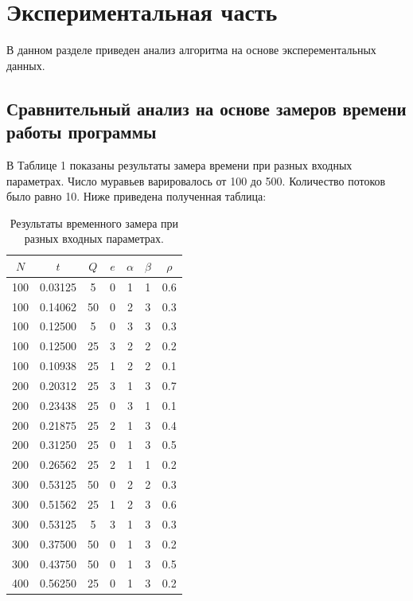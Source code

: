 \documentclass[12pt]{report}
\begin{document}
\chapter{Экспериментальная часть}

В данном разделе приведен анализ алгоритма на основе эксперементальных данных.

\section{Сравнительный анализ на основе замеров времени работы программы} 

В Таблице 1 показаны результаты замера времени при разных входных параметрах. Число муравьев варировалось от 100 до 500. Количество потоков было равно 10. Ниже приведена полученная таблица:

\begin{table}[h]
	\centering
	\caption{Результаты временного замера при разных входных параметрах.\\}
	\begin{tabular}{ | c | c | c | c | c | c | c |}
		\hline
		$N$ & $t$ & $Q$ & $e$ & $\alpha$ & $\beta$ & $\rho$  \\ \hline
		100 & 0.03125 & 5 & 0 & 1 & 1 & 0.6 \\ \hline
		100 & 0.14062 & 50 & 0 & 2 & 3 & 0.3 \\ \hline
		100 & 0.12500 & 5 & 0 & 3 & 3 & 0.3 \\ \hline
		100 & 0.12500 & 25 & 3 & 2 & 2 & 0.2 \\ \hline
		100 & 0.10938 & 25 & 1 & 2 & 2 & 0.1 \\ \hline
		200 & 0.20312 & 25 & 3 & 1 & 3 & 0.7 \\ \hline
		200 & 0.23438 & 25 & 0 & 3 & 1 & 0.1 \\ \hline
		200 & 0.21875 & 25 & 2 & 1 & 3 & 0.4 \\ \hline
		200 & 0.31250 & 25 & 0 & 1 & 3 & 0.5 \\ \hline
		200 & 0.26562 & 25 & 2 & 1 & 1 & 0.2 \\ \hline
		300 & 0.53125 & 50 & 0 & 2 & 2 & 0.3 \\ \hline
		300 & 0.51562 & 25 & 1 & 2 & 3 & 0.6 \\ \hline
		300 & 0.53125 & 5 & 3 & 1 & 3 & 0.3 \\ \hline
		300 & 0.37500 & 50 & 0 & 1 & 3 & 0.2 \\ \hline
		300 & 0.43750 & 50 & 0 & 1 & 3 & 0.5 \\ \hline
		400 & 0.56250 & 25 & 0 & 1 & 3 & 0.2 \\ \hline

\end{tabular}
\end{table}
\end{document}
